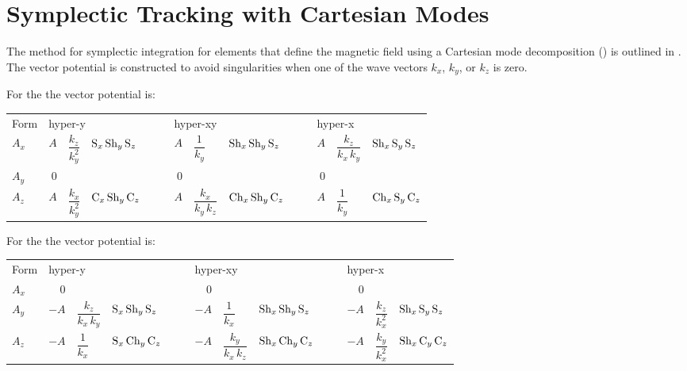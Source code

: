 \section{Symplectic Tracking with Cartesian Modes}
\label{s:wiggler.std}

The method for symplectic integration for elements that define the magnetic field using a
Cartesian mode decomposition () is outlined in .  The
vector potential is constructed to avoid singularities when one of the wave vectors $k_x$,
$k_y$, or $k_z$ is zero.

For the   the vector potential is:
\begin{center}
{
\setlength{\tabcolsep}{1pt}
\begin{tabular}{lrllrllrll}
  Form \; & \multicolumn{3}{l}{hyper-y}  & \multicolumn{3}{l}{hyper-xy}  & \multicolumn{3}{l}{hyper-x} \\
  $A_x$   & 
    $A$ & $\dfrac{k_z}{k_y^2}$      & $\text{S}_x \, \text{Sh}_y \, \text{S}_z \qquad$ &
    $A$ & $\dfrac{1}{k_y}$          & $\text{Sh}_x \, \text{Sh}_y \, \text{S}_z \qquad$ &
    $A$ & $\dfrac{k_z}{k_x \, k_y}$ & $\text{Sh}_x \, \text{S}_y \, \text{S}_z$ \\
  $A_y$   & 0 &&& 0 &&& 0 && \\
  $A_z$   & 
    $A$ & $\dfrac{k_x}{k_y^2}$      & $\text{C}_x \, \text{Sh}_y \, \text{C}_z \qquad$ &
    $A$ & $\dfrac{k_x}{k_y \, k_z}$ & $\text{Ch}_x \, \text{Sh}_y \, \text{C}_z \qquad$ &
    $A$ & $\dfrac{1}{k_y}$          & $\text{Ch}_x \, \text{S}_y \, \text{C}_z$ 
\end{tabular}
}
\end{center}

For the   the vector potential is:
\begin{center}
{
\setlength{\tabcolsep}{1pt}
\begin{tabular}{lrllrllrll}
  Form \; & \multicolumn{3}{l}{hyper-y}  & \multicolumn{3}{l}{hyper-xy}  & \multicolumn{3}{l}{hyper-x} \\
  $A_x$   & 0 &&& 0 &&& 0 && \\
  $A_y$   & 
    $-A$ & $\dfrac{k_z}{k_x \, k_y}$ & $\text{S}_x \, \text{Sh}_y \, \text{S}_z \qquad$ &
    $-A$ & $\dfrac{1}{k_x}$          & $\text{Sh}_x \, \text{Sh}_y \, \text{S}_z \qquad$ &
    $-A$ & $\dfrac{k_z}{k_x^2}$      & $\text{Sh}_x \, \text{S}_y \, \text{S}_z$ \\
  $A_z$   & 
    $-A$ & $\dfrac{1}{k_x}$          & $\text{S}_x \, \text{Ch}_y \, \text{C}_z \qquad$ &
    $-A$ & $\dfrac{k_y}{k_x \, k_z}$ & $\text{Sh}_x \, \text{Ch}_y \, \text{C}_z \qquad$ &
    $-A$ & $\dfrac{k_y}{k_x^2}$      & $\text{Sh}_x \, \text{C}_y \, \text{C}_z$ 
\end{tabular}
}
\end{center}


